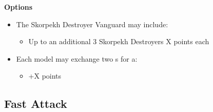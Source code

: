 \begin{minipage}[t]{0.72\textwidth}
	\vspace*{2em}
	\textbf{Options}
	\begin{itemize}
		\item The Skorpekh Destroyer Vanguard may include:
		\begin{itemize}
			\item Up to an additional 3 Skorpekh Destroyers \dotfill X points each
		\end{itemize}
		\item Each model may exchange two s for a:
		\begin{itemize}
			\item {} \dotfill +X points
		\end{itemize}
	\end{itemize}
\end{minipage}
\hspace{0.5em}


\newpage
\subsection{Fast Attack}

\newpage
\subsubsection[Charnel Scarab Swarms]{}

